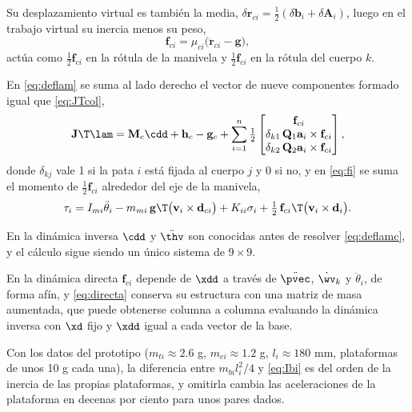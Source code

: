 Su desplazamiento virtual es también la media, $\delta\mathbf{r}_{ci}=\tfrac12(\delta\mathbf{b}_i+\delta\mathbf{A}_i)$, luego en el trabajo virtual su inercia menos su peso,
\begin{equation}
\mathbf{f}_{ci}=\mu_{ci}\big(\ddot{\mathbf{r}}_{ci}-\mathbf{g}\big),
\label{eq:fci}
\end{equation}
actúa como $\tfrac12\mathbf{f}_{ci}$ en la rótula de la manivela y $\tfrac12\mathbf{f}_{ci}$ en la rótula del cuerpo $k$.

En \eqref{eq:deflam} se suma al lado derecho el vector de nueve componentes formado igual que \eqref{eq:JTcol},
\begin{equation}
\mathbf{J}\T\lam=\mathbf{M}_c\cdd+\mathbf{h}_c-\mathbf{g}_c+\sum_{i=1}^{n}\tfrac12
\begin{bmatrix}\mathbf{f}_{ci}\\ \delta_{k1}\,\mathbf{Q}_1\mathbf{a}_i\times\mathbf{f}_{ci}\\ \delta_{k2}\,\mathbf{Q}_2\mathbf{a}_i\times\mathbf{f}_{ci}\end{bmatrix},
\label{eq:deflamc}
\end{equation}
donde $\delta_{kj}$ vale 1 si la pata $i$ está fijada al cuerpo $j$ y 0 si no, y en \eqref{eq:fi} se suma el momento de $\tfrac12\mathbf{f}_{ci}$ alrededor del eje de la manivela,
\begin{equation}
\tau_i=I_{mi}\ddot\theta_i-m_{mi}\,\mathbf{g}\T\big(\mathbf{v}_i\times\mathbf{d}_{ci}\big)+K_{ii}\sigma_i+\tfrac12\,\mathbf{f}_{ci}\T\big(\mathbf{v}_i\times\mathbf{d}_i\big).
\label{eq:fic}
\end{equation}

En la dinámica inversa $\cdd$ y $\ddot{\thv}$ son conocidas antes de resolver \eqref{eq:deflamc}, y el cálculo sigue siendo un único sistema de $9\times9$.

En la dinámica directa $\mathbf{f}_{ci}$ depende de $\xdd$ a través de $\ddot{\pvec}$, $\dot{\wv}_k$ y $\ddot\theta_i$, de forma afín, y \eqref{eq:directa} conserva su estructura con una matriz de masa aumentada, que puede obtenerse columna a columna evaluando la dinámica inversa con $\xd$ fijo y $\xdd$ igual a cada vector de la base.

Con los datos del prototipo ($m_{ti}\approx2.6$ g, $m_{ei}\approx1.2$ g, $l_i\approx180$ mm, plataformas de unos 10 g cada una), la diferencia entre $m_{bi}l_i^2/4$ y \eqref{eq:Ibi} es del orden de la inercia de las propias plataformas, y omitirla cambia las aceleraciones de la plataforma en decenas por ciento para unos pares dados.
